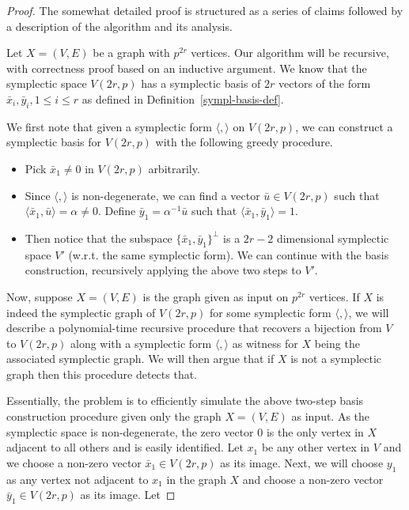 \documentclass{elsarticle}
\newcommand{\sympl}[1]{\langle #1 \rangle}
\begin{document}
\begin{proof}
  The somewhat detailed proof is structured as a series of claims
  followed by a description of the algorithm and its analysis.

  Let $X=(V,E)$ be a graph with $p^{2r}$ vertices. Our algorithm will
  be recursive, with correctness proof based on an inductive
  argument. We know that the symplectic space $V(2r,p)$ has a
  symplectic basis of $2r$ vectors of the form
  $\bar{x}_i, \bar{y}_i, 1\le i\le r$ as defined in
  Definition~\ref{sympl-basis-def}.


We first note that given a symplectic form $\sympl{,}$ on $V(2r,p)$,
we can construct a symplectic basis for $V(2r,p)$ with the following
greedy procedure.
\begin{itemize}
\item Pick $\bar{x}_1\ne 0$ in $V(2r,p)$ arbitrarily.
\item Since $\sympl{,}$ is non-degenerate, we can find a vector
  $\bar{u}\in V(2r,p)$ such that $\sympl{\bar{x}_1,\bar{u}}=\alpha\ne
  0$.  Define $\bar{y}_1 =\alpha^{-1}\bar{u}$ such that
  $\sympl{\bar{x}_1,\bar{y}_1}=1$.
\item Then notice that the subspace $\{\bar{x}_1,\bar{y}_1\}^\perp$ is
  a $2r-2$ dimensional symplectic space $V'$ (w.r.t. the same
  symplectic form). We can continue with the basis construction,
  recursively applying the above two steps to $V'$.
\end{itemize}

Now, suppose $X=(V,E)$ is the graph given as input on $p^{2r}$
vertices. If $X$ is indeed the symplectic graph of $V(2r,p)$ for some
symplectic form $\sympl{,}$, we will describe a polynomial-time
recursive procedure that recovers a bijection from $V$ to $V(2r,p)$
along with a symplectic form $\sympl{,}$ as witness for $X$ being the
associated symplectic graph. We will then argue that if $X$ is not a
symplectic graph then this procedure detects that.

Essentially, the problem is to efficiently simulate the above two-step
basis construction procedure given only the graph $X=(V,E)$ as input.
As the symplectic space is non-degenerate, the zero vector $0$ is the
only vertex in $X$ adjacent to all others and is easily identified.
Let $x_1$ be any other vertex in $V$ and we choose a non-zero vector
$\bar{x}_1\in V(2r,p)$ as its image. Next, we will choose $y_1$ as any
vertex not adjacent to $x_1$ in the graph $X$ and choose a non-zero
vector $\bar{y}_1\in V(2r,p)$ as its image. Let


\end{proof}
\end{document}
